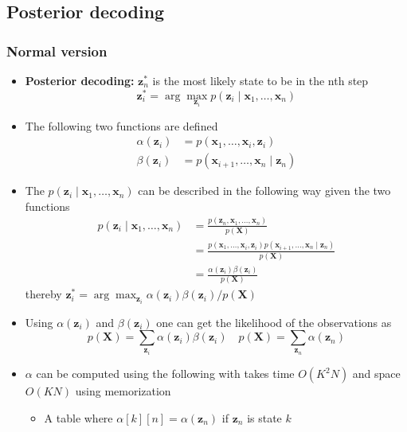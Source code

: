 \documentclass[a4, english]{article}
\begin{document}
\subsection{Posterior decoding}
\subsubsection{Normal version}
\begin{itemize}
	\item \textbf{Posterior decoding:} $\pmb z^*_n$ is the most likely state to be in the nth step
\begin{equation*}
  \pmb z^*_i = \arg \max_{\pmb z_i} p(\pmb z_i \mid \pmb x_1, \dots, \pmb x_n)
\end{equation*}
  \item The following two functions are defined  
\begin{align*}
  \alpha(\pmb z_i) &= p(\pmb x_1, \dots, \pmb x_i, \pmb z_i) \\
  \beta(\pmb z_i) &= p(\pmb x_{i+1}, \dots, \pmb x_n \mid \pmb z_n)
\end{align*}
  \item The $p(\pmb z_i \mid \pmb x_1, \dots, \pmb x_n)$ can be described in the following way given the two functions
\begin{align*}
  p(\pmb z_i \mid \pmb x_1, \dots, \pmb x_n) &= \frac{p(\pmb z_n, \pmb x_1, \dots, \pmb x_n)}{p(\pmb X)}\\
                                            &= \frac{p(\pmb x_1, \dots, \pmb x_i, \pmb z_i)  p(\pmb x_{i+1}, \dots, \pmb x_n \mid \pmb z_n)}{p(\pmb X)} \\
                                            &= \frac{\alpha(\pmb z_i) \beta(\pmb z_i)}{p(\pmb X)} 
\end{align*}
  thereby $\pmb z_i^* = \arg \max_{\pmb z_i} \alpha(\pmb z_i) \beta(\pmb z_i)/p(\pmb X)$ 
  \item Using $\alpha(\pmb z_i)$ and $\beta(\pmb z_i)$ one can get the likelihood of the observations as
\begin{equation*}
  p(\pmb X) = \sum_{\pmb z_i} \alpha (\pmb z_i) \beta(\pmb z_i) \quad p(\pmb X) = \sum_{\pmb z_n} \alpha (\pmb z_n)
\end{equation*}
	\item $\alpha$ can be computed using the following with takes time $O(K^2N)$ and space $O(KN)$ using memorization
  \begin{itemize}
	  \item A table where $\alpha[k][n] = \alpha(\pmb z_n)$ if $\pmb z_n$ is state $k$

\end{itemize}
\end{itemize}
\end{document}
